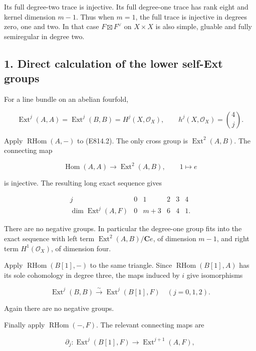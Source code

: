 Its full degree-two trace is injective. Its full degree-one trace has
rank eight and kernel dimension \(m-1\). Thus when \(m=1\), the full
trace is injective in degrees zero, one and two. In that case
\(F\boxtimes F^\vee\) on \(X\times X\) is also simple, gluable and fully
semiregular in degree two.

\subsection{1. Direct calculation of the lower self-Ext
groups}\label{SF-E814-direct-calculation-of-the-lower-self-ext-groups}

For a line bundle on an abelian fourfold,

\[
 \operatorname{Ext}^j(A,A)=\operatorname{Ext}^j(B,B)
   =H^j(X,\mathcal O_X),\qquad h^j(X,\mathcal O_X)=\binom4j.
 \tag{E814.5}
\]

Apply \(\operatorname{RHom}(A,-)\) to (E814.2). The only cross group is
\(\operatorname{Ext}^2(A,B)\). The connecting map

\[
 \operatorname{Hom}(A,A)\longrightarrow\operatorname{Ext}^2(A,B),
 \qquad 1\longmapsto e
\]

is injective. The resulting long exact sequence gives

\[
 \begin{array}{c|ccccc}
 j&0&1&2&3&4\\ \hline
 \dim\operatorname{Ext}^j(A,F)&0&m+3&6&4&1.
 \end{array}
 \tag{E814.6}
\]

There are no negative groups. In particular the degree-one group fits
into the exact sequence with left term
\(\operatorname{Ext}^2(A,B)/\mathbf Ce\), of dimension \(m-1\), and
right term \(H^1(\mathcal O_X)\), of dimension four.

Apply \(\operatorname{RHom}(B[1],-)\) to the same triangle. Since
\(\operatorname{RHom}(B[1],A)\) has its sole cohomology in degree three,
the maps induced by \(i\) give isomorphisms

\[
 \operatorname{Ext}^j(B,B)
       \xrightarrow{\sim}\operatorname{Ext}^j(B[1],F)
       \quad(j=0,1,2).
 \tag{E814.7}
\]

Again there are no negative groups.

Finally apply \(\operatorname{RHom}(-,F)\). The relevant connecting maps
are

\[
 \partial_j:\operatorname{Ext}^j(B[1],F)
              \longrightarrow\operatorname{Ext}^{j+1}(A,F),
 \tag{E814.8}
\]

